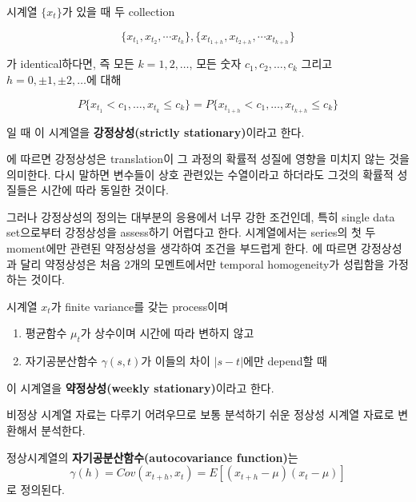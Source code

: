 \documentclass[b5paper,]{scrbook}
\theoremstyle{plain}
\theoremstyle{definition}
\numberwithin{equation}{section}
\let\BeginKnitrBlock\begin \let\EndKnitrBlock\end
\begin{document}
\BeginKnitrBlock{definition}[강정상성]
\protect\hypertarget{def:unnamed-chunk-213}{}{\label{def:unnamed-chunk-213} {} }시계열 \(\{ x_{t}\}\)가 있을 때 두 collection

\[\{ x_{t_{1}}, x_{t_{2}}, \cdots  x_{t_{k}}\}, \{ x_{t_{1+h}}, x_{t_{2+h}}, \cdots  x_{t_{k+h}}\}\]

가 identical하다면, 즉 모든 \(k=1,2,\ldots\), 모든 숫자 \(c_{1},c_{2},\ldots , c_{k}\) 그리고 \(h=0, \pm 1, \pm 2,\ldots\)에 대해

\[P \{ x_{t_{1}} <c_{1}, \ldots , x_{t_{k}} \leq c_{k}\}=P \{ x_{t_{1+h}} <c_{1}, \ldots , x_{t_{k+h}} \leq c_{k}\}\]

일 때 이 시계열을 \textbf{강정상성(strictly stationary)}이라고 한다.
\EndKnitrBlock{definition}

\citep{Huser2013}에 따르면 강정상성은 translation이 그 과정의 확률적 성질에 영향을 미치지 않는 것을 의미한다. 다시 말하면 변수들이 상호 관련있는 수열이라고 하더라도 그것의 확률적 성질들은 시간에 따라 동일한 것이다.

그러나 강정상성의 정의는 대부분의 응용에서 너무 강한 조건인데, 특히 single data set으로부터 강정상성을 assess하기 어렵다고 한다. 시계열에서는 series의 첫 두 moment에만 관련된 약정상성을 생각하여 조건을 부드럽게 한다. \citep{Huser2013}에 따르면 강정상성과 달리 약정상성은 처음 2개의 모멘트에서만 temporal homogeneity가 성립함을 가정하는 것이다.

\BeginKnitrBlock{definition}[약정상성]
\protect\hypertarget{def:unnamed-chunk-214}{}{\label{def:unnamed-chunk-214} {} }시계열 \(x_{t}\)가 finite variance를 갖는 process이며

\begin{enumerate}
\def\labelenumi{\arabic{enumi}.}
\item
  평균함수 \(\mu_{t}\)가 상수이며 시간에 따라 변하지 않고
\item
  자기공분산함수 \(\gamma(s,t)\)가 이들의 차이 \(|s-t|\)에만 depend할 때
\end{enumerate}

이 시계열을 \textbf{약정상성(weekly stationary)}이라고 한다.
\EndKnitrBlock{definition}

비정상 시계열 자료는 다루기 어려우므로 보통 분석하기 쉬운 정상성 시계열 자료로 변환해서 분석한다.

\BeginKnitrBlock{definition}[자기공분산함수]
\protect\hypertarget{def:unnamed-chunk-215}{}{\label{def:unnamed-chunk-215} {} }정상시계열의 \textbf{자기공분산함수(autocovariance function)}는
\[\gamma(h)=Cov(x_{t+h}, x_{t})=E[(x_{t+h}-\mu)(x_{t}-\mu)]\]
로 정의된다.
\EndKnitrBlock{definition}
\end{document}
